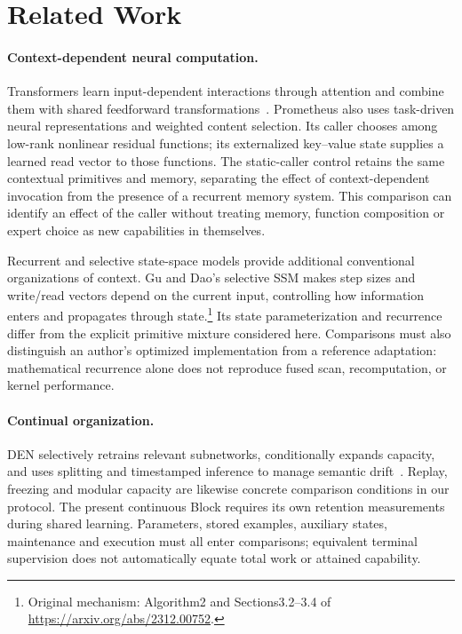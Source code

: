 \section{Related Work}
\label{sec:related-work}

\paragraph{Context-dependent neural computation.}
Transformers learn input-dependent interactions through attention and combine
them with shared feedforward transformations~\cite{vaswani2017attention}.
Prometheus also uses task-driven neural representations and weighted content
selection. Its caller chooses among low-rank nonlinear residual functions;
its externalized key--value state supplies a learned read vector to those
functions. The static-caller control retains the same contextual primitives
and memory, separating the effect of context-dependent invocation from the
presence of a recurrent memory system. This comparison can identify an effect
of the caller without treating memory, function composition or expert choice
as new capabilities in themselves.

Recurrent and selective state-space models provide additional conventional
organizations of context. Gu and Dao's selective SSM makes step sizes and
write/read vectors depend on the current input, controlling how information
enters and propagates through state.\footnote{Original mechanism: Algorithm2
and Sections3.2--3.4 of \url{https://arxiv.org/abs/2312.00752}.}
Its state parameterization and recurrence differ from the explicit primitive
mixture considered here. Comparisons must also distinguish an author's
optimized implementation from a reference adaptation: mathematical recurrence
alone does not reproduce fused scan, recomputation, or kernel performance.

\paragraph{Continual organization.}
DEN selectively retrains relevant subnetworks, conditionally expands capacity,
and uses splitting and timestamped inference to manage semantic
drift~\cite{yoon2018lifelong}. Replay, freezing and modular capacity are likewise
concrete comparison conditions in our protocol. The present continuous Block
requires its own retention measurements during shared learning. Parameters,
stored examples, auxiliary states, maintenance and execution must all enter
comparisons; equivalent terminal supervision does not automatically equate
total work or attained capability.

